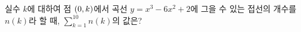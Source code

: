 실수 $k$에 대하여 점 $(0{,}\mkern3mu\mathopen{}k)$에서 곡선 $y=x^3-6x^2+2$에 그을 수 있는 접선의 개수를 $n(k)$라 할 때, $\displaystyle\sum_{k=1}^{10} n(k)$의 값은?
